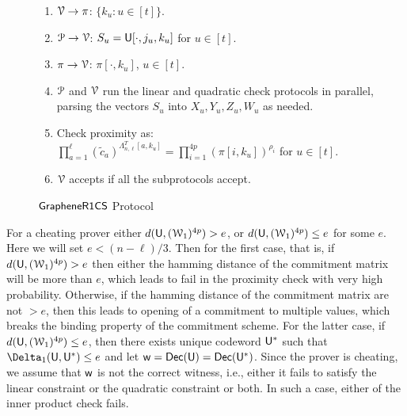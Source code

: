 \begin{figure}[h!]
{\begin{framed}
\begin{enumerate}[{\rm 1.}]
				\item $\mathcal{V}\rightarrow\pi$: $\{k_u:u\in [t]\}$.
				\item $\mathcal{P}\rightarrow\mathcal{V}$: $S_u=\mathsf{U}[\cdot,j_u,k_u]$ for $u\in [t]$.
				\item $\pi\rightarrow\mathcal{V}$: $\pi[\cdot,k_u]$, $u\in [t]$.
				\item $\mathcal{P}$ and $\mathcal{V}$ run the linear and quadratic check protocols in parallel, parsing the vectors $S_u$ into $X_u,Y_u,Z_u,W_u$ as needed.
				\item Check proximity as: $\prod_{a=1}^\ell	(\tilde{c}_a)^{\Lambda_{n,\ell}^T[a,k_u]}=\prod_{i=1}^{4p}(\pi[i,k_u])^{\rho_i}$ for $u\in [t]$.
				\item $\mathcal{V}$ accepts if all the subprotocols accept.
			\end{enumerate}
		\end{framed}
	}
	\caption{$\mathsf{GrapheneR1CS}$ Protocol}
	\label{fig:graphene}
\end{figure}
For a cheating prover either $d(\mathsf{U}, (\mathcal{W}_1)^{4p}) > e$, or $d(\mathsf{U}, (\mathcal{W}_1)^{4p}) \leq e$ for some $e$. Here we will set $e < (n - \ell)/3$. Then for the first case, that is, if $d(\mathsf{U}, (\mathcal{W}_1)^{4p}) > e$ then either the hamming distance of the commitment matrix will be more than $e$, which leads to fail in the proximity check with very high probability. Otherwise, if the hamming distance of the commitment matrix are not $> e$, then this leads to opening of a commitment to multiple values, which breaks the binding property of the commitment scheme.
For the latter case, if $d(\mathsf{U}, (\mathcal{W}_1)^{4p}) \leq e$, then there exists unique codeword $\mathsf{U}^\ast$ such that $\Delta_1(\ewit, \ewit^\ast) \leq e$ and let $\mathsf{w} = \mathsf{Dec}(\mathsf{U}) = \mathsf{Dec}(\mathsf{U}^\ast)$. Since the prover is cheating, we assume that $\mathsf{w}$ is not the correct witness, i.e., either it fails to satisfy the linear constraint or the quadratic constraint or both. In such a case, either of the inner product check fails.

